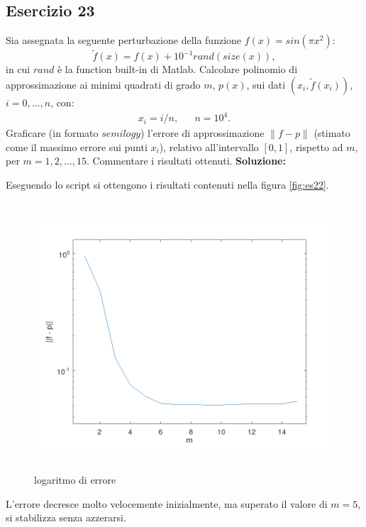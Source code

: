 \subsection{Esercizio 23}
Sia assegnata la seguente perturbazione della funzione $f(x) = sin(\pi x^2)$:
\[
    \tilde{f}(x) = f(x) + 10^{-1} rand(size(x)),
\]
in cui $rand$ è la function built-in di Matlab. Calcolare polinomio di approssimazione ai minimi
quadrati di grado $m$, $p(x)$, sui dati $(x_i, \tilde{f}(x_i))$, $i = 0, \dots, n$, con:
\begin{eqnarray*}
    x_i = i/n, & & n = 10^4.
\end{eqnarray*}
Graficare (in formato $semilogy$) l'errore di approssimazione $\|f - p\|$ (stimato come il massimo
errore sui punti $x_i$), relativo all'intervallo $[0, 1]$, rispetto ad $m$, per $m = 1, 2, \dots, 15$.
Commentare i risultati ottenuti.
\newline \textbf{Soluzione:}

Eseguendo lo script  si ottengono i risultati contenuti nella figura \ref{fig:es22}.
\begin{figure}[!ht]
    \centering
    \includegraphics[width=16cm,height=10cm,keepaspectratio]{capitolo5/es23_figure.png}
    \caption{logaritmo di errore}
    \label{fig:es23}
\end{figure}
\FloatBarrier
L'errore decresce molto velocemente inizialmente, ma superato il valore di $m = 5$, si stabilizza
senza azzerarsi.
